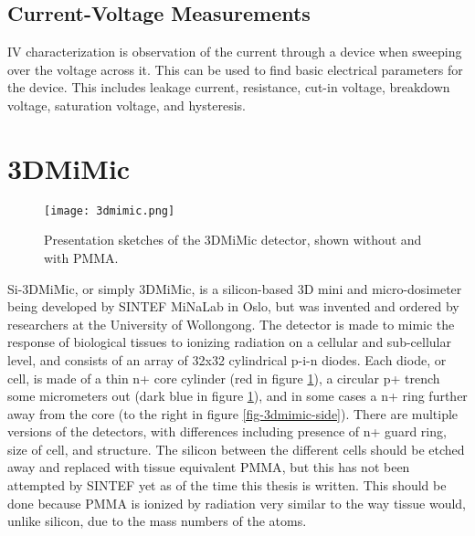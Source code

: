 \documentclass[../main/thesis.tex]{subfiles}
\begin{document}
\subsection{Current-Voltage Measurements}
\label{t-iv}
\gls{IV} characterization is observation of the current through a device when sweeping over the voltage across it. This can be used to find basic electrical parameters for the device. This includes leakage current, resistance, cut-in voltage, breakdown voltage, saturation voltage, and hysteresis. 

\section{3DMiMic}
\label{3d-3d}

\begin{figure}%
	\centering
	\texttt{[image: 3dmimic.png]}
	\caption{Presentation sketches of the 3DMiMic detector, shown without and with PMMA. \citep{Trento2015}}
	\label{fig-3dmimic}
\end{figure}

Si-3DMiMic, or simply 3DMiMic, is a silicon-based 3D mini and micro-dosimeter being developed by SINTEF MiNaLab in Oslo, but was invented and ordered by researchers at the University of Wollongong. The detector is made to mimic the response of biological tissues to ionizing radiation on a cellular and sub-cellular level, and consists of an array of 32x32 cylindrical p-i-n diodes. Each diode, or cell, is made of a thin n+ core cylinder (red in figure \ref{fig-3dmimic}), a circular p+ trench some micrometers out (dark blue in figure \ref{fig-3dmimic}), and in some cases a n+ ring further away from the core (to the right in figure \ref{fig-3dmimic-side}). There are multiple versions of the detectors, with differences including presence of n+ guard ring, size of cell, and structure. The silicon between the different cells should be etched away and replaced with tissue equivalent \gls{PMMA}, but this has not been attempted by SINTEF yet as of the time this thesis is written. This should be done because \gls{PMMA} is ionized by radiation very similar to the way tissue would, unlike silicon, due to the mass numbers of the atoms. 

\end{document}
